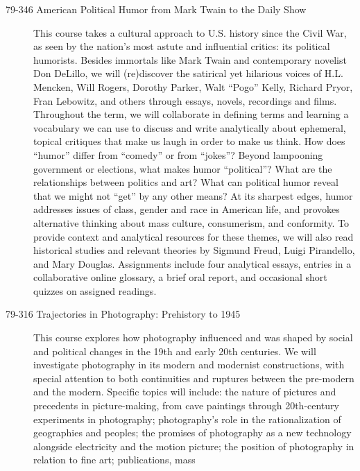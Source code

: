 \begin{description}
    \item [79-346 American Political Humor from Mark Twain to the Daily Show]
        This course takes a cultural approach to U.S. history since the Civil
        War, as seen by the nation's most astute and influential critics: its
        political humorists. Besides immortals like Mark Twain and contemporary
        novelist Don DeLillo, we will (re)discover the satirical yet hilarious
        voices of H.L. Mencken, Will Rogers, Dorothy Parker, Walt ``Pogo''
        Kelly, Richard Pryor, Fran Lebowitz, and others through essays, novels,
        recordings and films. Throughout the term, we will collaborate in
        defining terms and learning a vocabulary we can use to discuss and write
        analytically about ephemeral, topical critiques that make us laugh in
        order to make us think. How does ``humor'' differ from ``comedy'' or
        from ``jokes''? Beyond lampooning government or elections, what makes
        humor ``political''? What are the relationships between politics and
        art?  What can political humor reveal that we might not ``get'' by any
        other means?  At its sharpest edges, humor addresses issues of class,
        gender and race in American life, and provokes alternative thinking
        about mass culture, consumerism, and conformity. To provide context and
        analytical resources for these themes, we will also read historical
        studies and relevant theories by Sigmund Freud, Luigi Pirandello, and
        Mary Douglas.  Assignments include four analytical essays, entries in a
        collaborative online glossary, a brief oral report, and occasional short
        quizzes on assigned readings.
    \item [79-316 Trajectories in Photography: Prehistory to 1945] This course
        explores how photography influenced and was shaped by social and
        political changes in the 19th and early 20th centuries. We will
        investigate photography in its modern and modernist constructions, with
        special attention to both continuities and ruptures between the
        pre-modern and the modern. Specific topics will include: the nature of
        pictures and precedents in picture-making, from cave paintings through
        20th-century experiments in photography; photography's role in the
        rationalization of geographies and peoples; the promises of photography
        as a new technology alongside electricity and the motion picture; the
        position of photography in relation to fine art; publications, mass

\end{description}
